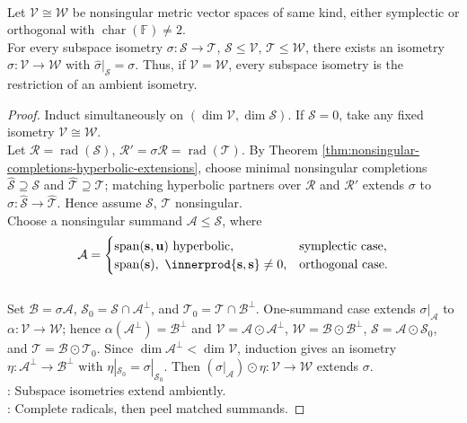 \begin{theorem} \label{thm:witt-extension-theorem-metric-spaces} \\
Let $\mathcal{V}\cong\mathcal{W}$ be nonsingular metric vector spaces of same kind, either symplectic or orthogonal with $\operatorname{char}(\mathbb{F})\neq2$.\\
For every subspace isometry $\sigma:\mathcal{S}\to\mathcal{T}$, $\mathcal{S}\leq\mathcal{V}$, $\mathcal{T}\leq\mathcal{W}$, there exists an isometry $\widehat{\sigma}:\mathcal{V}\to\mathcal{W}$ with $\widehat{\sigma}|_{\mathcal{S}}=\sigma$. Thus, if $\mathcal{V}=\mathcal{W}$, every subspace isometry is the restriction of an ambient isometry.
\begin{proof}
Induct simultaneously on $(\dim\mathcal{V},\dim\mathcal{S})$. If $\mathcal{S}=0$, take any fixed isometry $\mathcal{V}\cong\mathcal{W}$.\\
Let $\mathcal{R}=\operatorname{rad}(\mathcal{S})$, $\mathcal{R}'=\sigma\mathcal{R}=\operatorname{rad}(\mathcal{T})$.
By Theorem \ref{thm:nonsingular-completions-hyperbolic-extensions}, choose minimal nonsingular completions $\widehat{\mathcal{S}}\supseteq\mathcal{S}$ and $\widehat{\mathcal{T}}\supseteq\mathcal{T}$; matching hyperbolic partners over $\mathcal{R}$ and $\mathcal{R}'$ extends $\sigma$ to $\widehat{\sigma}:\widehat{\mathcal{S}}\to\widehat{\mathcal{T}}$. Hence assume $\mathcal{S}$, $\mathcal{T}$ nonsingular.\\
Choose a nonsingular summand $\mathcal{A}\leq\mathcal{S}$, where
\begin{align}
\mathcal{A}=
\begin{cases}
\operatorname{span}(\mathbf{s},\mathbf{u}) \text{ hyperbolic}, & \text{symplectic case},\\
\operatorname{span}(\mathbf{s}),\ \innerprod{\mathbf{s},\mathbf{s}}\neq0, & \text{orthogonal case}.
\end{cases} \nonumber
\end{align}\\
Set $\mathcal{B}=\sigma\mathcal{A}$, $\mathcal{S}_0=\mathcal{S}\cap\mathcal{A}^{\perp}$, and $\mathcal{T}_0=\mathcal{T}\cap\mathcal{B}^{\perp}$. One-summand case extends $\sigma|_{\mathcal{A}}$ to $\alpha:\mathcal{V}\to\mathcal{W}$; hence $\alpha(\mathcal{A}^{\perp})=\mathcal{B}^{\perp}$ and $\mathcal{V}=\mathcal{A}\odot\mathcal{A}^{\perp}$, $\mathcal{W}=\mathcal{B}\odot\mathcal{B}^{\perp}$, $\mathcal{S}=\mathcal{A}\odot\mathcal{S}_0$, and $\mathcal{T}=\mathcal{B}\odot\mathcal{T}_0$. Since $\dim\mathcal{A}^{\perp}<\dim\mathcal{V}$, induction gives an isometry $\eta:\mathcal{A}^{\perp}\to\mathcal{B}^{\perp}$ with $\eta|_{\mathcal{S}_0}=\sigma|_{\mathcal{S}_0}$. Then $(\sigma|_{\mathcal{A}})\odot\eta:\mathcal{V}\to\mathcal{W}$ extends $\sigma$.\\
: Subspace isometries extend ambiently.\\
: Complete radicals, then peel matched summands.
\end{proof}
\end{theorem}

